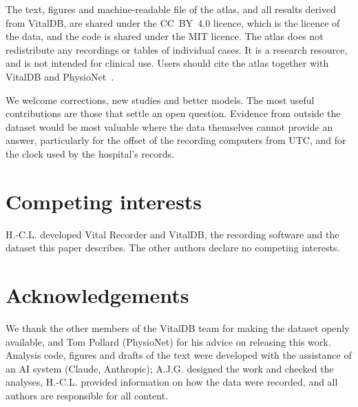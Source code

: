 \documentclass[11pt,a4paper]{article}
\begin{document}
The text, figures and machine-readable file of the atlas, and all results derived from VitalDB, are shared under the
CC~BY~4.0 licence, which is the licence of the data, and the code is shared under the MIT licence. The atlas does not
redistribute any recordings or tables of individual cases. It is a research resource, and is not intended for clinical
use. Users should cite the atlas together with VitalDB and
PhysioNet~\citep{lee2022vitaldb,lee2022vitaldb-physionet,pollard2026physionet}.

We welcome corrections, new studies and better models. The most useful contributions are those that settle an open
question. Evidence from outside the dataset would be most valuable where the data themselves cannot provide an answer,
particularly for the offset of the recording computers from UTC, and for the clock used by the hospital's records.

\section*{Competing interests}

H.-C.L. developed Vital Recorder and VitalDB, the recording software and the dataset this paper describes. The other
authors declare no competing interests.

\section*{Acknowledgements}

We thank the other members of the VitalDB team for making the dataset openly available, and Tom Pollard (PhysioNet) for his advice on
releasing this work. Analysis code, figures and drafts of the text were developed with the assistance of an AI
system (Claude, Anthropic); A.J.G. designed the work and checked the analyses, H.-C.L. provided information on how
the data were recorded, and all authors are responsible for all content.



\end{document}
